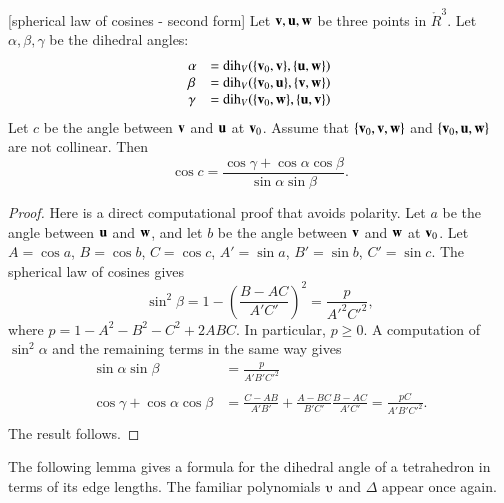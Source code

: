 \begin{lemma}[spherical law of cosines - second form]
Let ${\mathbf v},{\mathbf u},{\mathbf w}$ be three points in $\ring{R}^3$.
Let $\alpha,\beta,\gamma$ be the dihedral angles: 
   $$
   \begin{array}{lll}
     \alpha &= \operatorname{dih}_V(\{{\mathbf v}_0,{\mathbf v}\},\{{\mathbf u},{\mathbf w}\})\\
     \beta &= \operatorname{dih}_V(\{{\mathbf v}_0,{\mathbf u}\},\{{\mathbf v},{\mathbf w}\})\\
     \gamma&= \operatorname{dih}_V(\{{\mathbf v}_0,{\mathbf w}\},\{{\mathbf u},{\mathbf v}\})\\
     \end{array}
   $$
Let $c$ be the
angle between ${\mathbf v}$ and ${\mathbf u}$ at ${\mathbf v}_0$. 
Assume that $\{{\mathbf v}_0,{\mathbf v},{\mathbf w}\}$ and $\{{\mathbf v}_0,{\mathbf u},{\mathbf w}\}$ are not collinear.
Then
    $$
    \cos c = \frac{\cos \gamma + \cos \alpha \cos \beta}
     {\sin \alpha\sin \beta}.
    $$
\end{lemma}
%
%

\begin{proof}  
Here is a direct
computational proof that avoids polarity.
Let $a$ be the angle between ${\mathbf u}$ and ${\mathbf w}$, and let $b$ be the angle
between ${\mathbf v}$ and ${\mathbf w}$ at ${\mathbf v}_0$.
Let $A=\cos a$, $B=\cos b$, $C=\cos c$,
$A'=\sin a$, $B'=\sin b$, $C'=\sin c$.  The
spherical law of cosines gives
   $$\sin^2\beta = 1-\left(\frac{B-A C}{A' C'}\right)^2
     = \frac{p}{A'^2 C'^2},$$
where $p=1-A^2 - B^2 - C^2 + 2 A B C$.
In particular, $p\ge 0$.
%
A computation of $\sin^2\alpha$ and the remaining terms in the same way gives
   $$
   \begin{array}{lll}
     \sin\alpha\sin\beta &= \frac{\displaystyle p}{\displaystyle A' B' C'^2}\\ 
      \\
     \cos\gamma + \cos\alpha \cos\beta &=
         \frac{\displaystyle C - A B}{\displaystyle A' B'} + \frac{\displaystyle A - B C}{\displaystyle B' C'} \frac{\displaystyle B - A C}{\displaystyle A' C'}
         = \frac{\displaystyle p C}{\displaystyle A' B' C'^2}.\\
   \end{array}
   $$
The result follows.
\end{proof}

The following lemma gives a formula for the dihedral angle
of a tetrahedron in terms of its edge lengths.  The
familiar polynomials $\ups$ and $\Delta$ appear once again.
%
%


